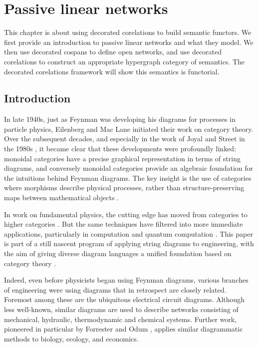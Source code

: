 \chapter{Passive linear networks} \label{ch.circuits}
This chapter is about using decorated corelations to build semantic functors. We
first provide an introduction to passive linear networks and what they model. We
then use decorated cospans to define open networks, and use decorated
corelations to construct an appropriate hypergraph category of semantics. The
decorated corelations framework will show this semantics is functorial.

\section{Introduction}\label{sec:intro}
In late 1940s, just as Feynman was developing his diagrams for processes in particle physics, Eilenberg and Mac Lane initiated their work on category theory.  Over the subsequent decades, and especially in the work of Joyal and Street in the 1980s \cite{JS1,JS2}, it became clear that these developments were profoundly linked: monoidal categories have a precise graphical representation in terms of string diagrams, and conversely monoidal categories provide an algebraic foundation for the intuitions behind Feynman diagrams.  The key insight is the use of categories where morphisms describe physical processes, rather than structure-preserving maps between mathematical objects \cite{BaezStay,CP}.

In work on fundamental physics, the cutting edge has moved from categories
to higher categories \cite{BL}.  But the same techniques have filtered into more immediate applications, particularly in computation and quantum computation \cite{AC,Ba1,Se}.  This paper is part of a still nascent program of applying string diagrams to engineering, with the aim of giving diverse diagram languages a unified foundation based on category theory \cite{BE,BSZ,KSW,RSW,Sp}. 

Indeed, even before physicists began using Feynman diagrams, various branches of engineering were using diagrams that in retrospect are closely related.   Foremost among these are the ubiquitous electrical circuit diagrams. Although less well-known, similar diagrams are used to describe networks consisting of mechanical, hydraulic, thermodynamic and chemical systems.   Further work, pioneered in particular by 
Forrester \cite{Fo} and Odum \cite{Od}, applies similar diagrammatic methods to biology, ecology, and economics.

